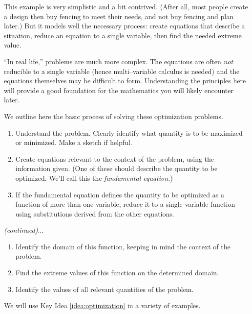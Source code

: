 This example is very simplistic and a bit contrived. (After all, most people create a design then buy fencing to meet their needs, and not buy fencing and plan later.) But it models well the necessary process: create equations that describe a situation, reduce an equation to a single variable, then find the needed extreme value.

``In real life,'' problems are much more complex. The equations are often \textit{not} reducible to a single variable (hence multi--variable calculus is needed) and the equations themselves may be difficult to form. Understanding the principles here will provide a good foundation for the mathematics you will likely encounter later.

We outline here the basic process of solving these optimization problems.
\enlargethispage{2\baselineskip}
{}
{\begin{enumerate}
		\item		Understand the problem. Clearly identify what quantity is to be maximized or minimized. Make a sketch if helpful.
		\item		Create equations relevant to the context of the problem, using the information given. (One of these should describe the quantity to be optimized. We'll call this the \textit{fundamental equation.})
		\item		If the fundamental equation defines the quantity to be optimized as a function of more than one variable, reduce it to a single variable function using substitutions derived from the other equations.
		\end{enumerate}
\textit{\small (continued)$\ldots$}
}

\addtocounter{keyideacounter}{-1}
{\begin{enumerate}\addtocounter{enumi}{3}
		\item		Identify the domain of this function, keeping in mind the context of the problem.
		\item		Find the extreme values of this function on the determined domain.
		\item		Identify the values of all relevant quantities of the problem.
		\end{enumerate}
}

We will use Key Idea \ref{idea:optimization} in a variety of examples.\\

